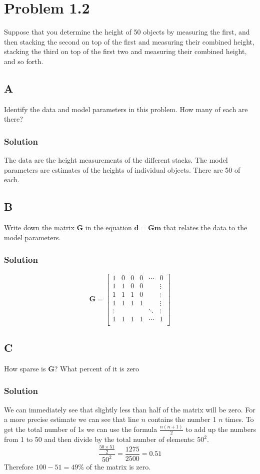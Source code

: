 \section*{Problem 1.2}
Suppose that you determine the height of 50 objects by measuring the first, and then stacking the second on top of the first and measuring their combined height, stacking the third on top of the first two and measuring their combined height, and so forth.
\subsection*{A}
Identify the data and model parameters in this problem. How many of each are there?
\subsubsection*{Solution}
The data are the height measurements of the different stacks. The model parameters are estimates of the heights of individual objects. There are 50 of each.
\subsection*{B}
Write down the matrix $ \mathbf{G} $ in the equation $ \mathbf{d} = \mathbf{Gm}$ that relates the data to the model parameters.
\subsubsection*{Solution}
\begin{equation*}
\mathbf{G} = \begin{bmatrix}
1 & 0 & 0 & 0 & \cdots  & 0 \\
1 & 1 & 0 & 0 & & \vdots \\
1 & 1 & 1 & 0 & & \vdots \\
1 & 1 & 1 & 1 & & \vdots \\
\vdots & & & & \ddots & \vdots \\
1 & 1 & 1 & 1 & \cdots & 1  \\
\end{bmatrix}
\end{equation*}
\subsection*{C}
How sparse is $ \mathbf{G} $? What percent of it is zero
\subsubsection*{Solution}
We can immediately see that slightly less than half of the matrix will be zero. For a more precise estimate we can see that line $n$ contains the number 1 $n$ times. To get the total number of 1s we can use the formula $ \frac{n(n+1)}{2}$ to add up the numbers from 1 to 50 and then divide by the total number of elements: $50^2$.
\begin{equation*}
    \frac{\frac{50 \times 51}{2}}{50^2} = \frac{1275}{2500} = 0.51
\end{equation*}
Therefore $100-51=49\%$ of the matrix is zero.